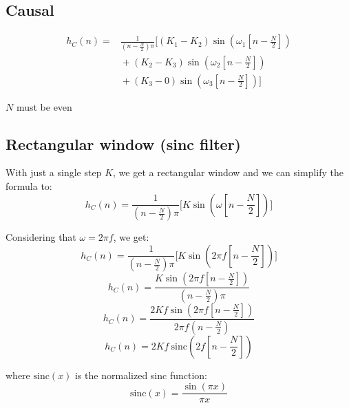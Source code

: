 \documentclass{article}
\begin{document}
\subsection{Causal}
\begin{equation}
\begin{aligned}
    h_C\left(n\right) = {} & \frac{1}{\left(n-\frac{N}{2}\right)\pi}\Biggl[\left(K_1-K_2\right)\sin\left(\omega_1\left[n-\frac{N}{2}\right]\right) \\
    & {} + \left(K_2-K_3\right)\sin\left(\omega_2\left[n-\frac{N}{2}\right]\right) \\
    & {} + \left(K_3-0\right)\sin\left(\omega_3\left[n-\frac{N}{2}\right]\right)\Biggr]
\end{aligned}
\end{equation}

$N$ must be even

\subsection{Rectangular window (sinc filter)}
With just a single step $K$, we get a rectangular window and we can simplify the formula to:
\begin{equation}
    h_C\left(n\right) = \frac{1}{\left(n-\frac{N}{2}\right)\pi}\Biggl[K\sin\left(\omega\left[n-\frac{N}{2}\right]\right)\Biggr]
\end{equation}

Considering that $\omega = 2 \pi f$, we get:
\begin{equation}
    h_C\left(n\right) = \frac{1}{\left(n-\frac{N}{2}\right)\pi}\Biggl[K\sin\left(2 \pi f \left[n-\frac{N}{2}\right]\right)\Biggr]
\end{equation}
\begin{equation}
    h_C\left(n\right) = \frac{K\sin\left(2 \pi f \left[n-\frac{N}{2}\right]\right)}{\left(n-\frac{N}{2}\right)\pi}
\end{equation}
\begin{equation}
    h_C\left(n\right) = \frac{2 K f \sin\left(2 \pi f \left[n-\frac{N}{2}\right]\right)}{2 \pi f \left(n-\frac{N}{2}\right)}
\end{equation}
\begin{equation}
    h_C\left(n\right) = 2 K f ~ \text{sinc} \left(2 f \left[n-\frac{N}{2}\right]\right)
\end{equation}

where $\text{sinc}\left(x\right)$ is the normalized sinc function:
\begin{equation}
    \text{sinc} \left(x\right) = \frac{\sin\left(\pi x\right)}{\pi x}
\end{equation}
\end{document}
